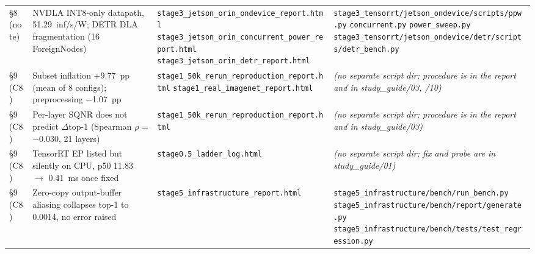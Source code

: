 \documentclass[11pt]{article}
\begin{document}
\begin{longtable}{L{0.9cm} L{4.0cm} L{4.3cm} L{5.0cm}}
\addlinespace[2pt]
\S8 (note) & NVDLA INT8-only datapath, 51.29~inf/s/W; DETR DLA fragmentation (16 ForeignNodes) & \texttt{stage3\_\allowbreak jetson\_\allowbreak orin\_\allowbreak ondevice\_\allowbreak report.html} \newline \texttt{stage3\_\allowbreak jetson\_\allowbreak orin\_\allowbreak concurrent\_\allowbreak power\_\allowbreak report.html} \newline \texttt{stage3\_\allowbreak jetson\_\allowbreak orin\_\allowbreak detr\_\allowbreak report.html} & \texttt{stage3\_\allowbreak tensorrt/\allowbreak jetson\_\allowbreak ondevice/\allowbreak scripts/\allowbreak ppw.py} \newline \texttt{concurrent.py} \newline \texttt{power\_\allowbreak sweep.py} \newline \texttt{stage3\_\allowbreak tensorrt/\allowbreak jetson\_\allowbreak ondevice/\allowbreak detr/\allowbreak scripts/\allowbreak detr\_\allowbreak bench.py} \\
\addlinespace[2pt]
\S9 (C8) & Subset inflation +9.77~pp (mean of 8 configs); preprocessing $-$1.07~pp & \texttt{stage1\_\allowbreak 50k\_\allowbreak rerun\_\allowbreak reproduction\_\allowbreak report.html} \newline \texttt{stage1\_\allowbreak real\_\allowbreak imagenet\_\allowbreak report.html} & \emph{(no separate script dir; procedure is in the report and in study\_guide/03, /10)} \\
\addlinespace[2pt]
\S9 (C8) & Per-layer SQNR does not predict $\Delta$top-1 (Spearman $\rho$ = $-$0.030, 21 layers) & \texttt{stage1\_\allowbreak 50k\_\allowbreak rerun\_\allowbreak reproduction\_\allowbreak report.html} & \emph{(no separate script dir; procedure is in the report and in study\_guide/03)} \\
\addlinespace[2pt]
\S9 (C8) & TensorRT EP listed but silently on CPU, p50 11.83 $\to$ 0.41~ms once fixed & \texttt{stage0.5\_\allowbreak ladder\_\allowbreak log.html} & \emph{(no separate script dir; fix and probe are in study\_guide/01)} \\
\addlinespace[2pt]
\S9 (C8) & Zero-copy output-buffer aliasing collapses top-1 to 0.0014, no error raised & \texttt{stage5\_\allowbreak infrastructure\_\allowbreak report.html} & \texttt{stage5\_\allowbreak infrastructure/\allowbreak bench/\allowbreak run\_\allowbreak bench.py} \newline \texttt{stage5\_\allowbreak infrastructure/\allowbreak bench/\allowbreak report/\allowbreak generate.py} \newline \texttt{stage5\_\allowbreak infrastructure/\allowbreak bench/\allowbreak tests/\allowbreak test\_\allowbreak regression.py} \\

\end{longtable}
\end{document}
